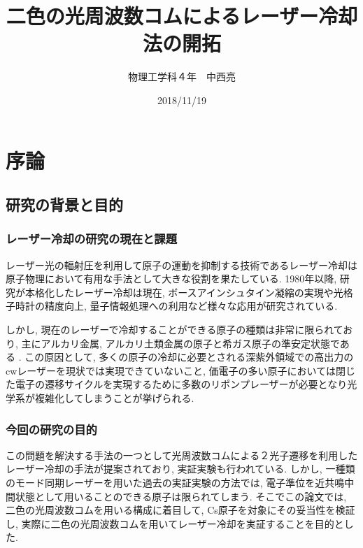 \documentclass[uplatex, dvipdfmx, a4paper, report, papersize, 11pt]{jsbook}
\title{二色の光周波数コムによるレーザー冷却法の開拓}
\author{物理工学科４年　中西亮}
\date{2018/11/19}
\begin{document}
\maketitle
\newpage

\setcounter{tocdepth}{2}
\tableofcontents


\newpage
\chapter{序論}
\section{研究の背景と目的}
\subsection{レーザー冷却の研究の現在と課題}
レーザー光の輻射圧を利用して原子の運動を抑制する技術であるレーザー冷却は原子物理において有用な手法として大きな役割を果たしている. 1980年以降, 研究が本格化したレーザー冷却は現在, ボースアインシュタイン凝縮の実現や光格子時計の精度向上, 量子情報処理への利用など様々な応用が研究されている\cite{レーザー冷却とその応用}.\par
しかし, 現在のレーザーで冷却することができる原子の種類は非常に限られており, 主にアルカリ金属, アルカリ土類金属の原子と希ガス原子の準安定状態である \cite{PhysRevA.73.063407}. この原因として, 多くの原子の冷却に必要とされる深紫外領域での高出力のcwレーザーを現状では実現できていないこと, 価電子の多い原子においては閉じた電子の遷移サイクルを実現するために多数のリポンプレーザーが必要となり光学系が複雑化してしまうことが挙げられる.\par


\subsection{今回の研究の目的}
この問題を解決する手法の一つとして光周波数コムによる２光子遷移を利用したレーザー冷却の手法が提案されており, 実証実験も行われている\cite{PhysRevX.6.041004, PhysRevA.73.063407}. しかし, 一種類のモード同期レーザーを用いた過去の実証実験の方法では, 電子準位を近共鳴中間状態として用いることのできる原子は限られてしまう. そこでこの論文では, 二色の光周波数コムを用いる構成に着目して, Cs原子を対象にその妥当性を検証し, 実際に二色の光周波数コムを用いてレーザー冷却を実証することを目的とした. \\
\end{document}
